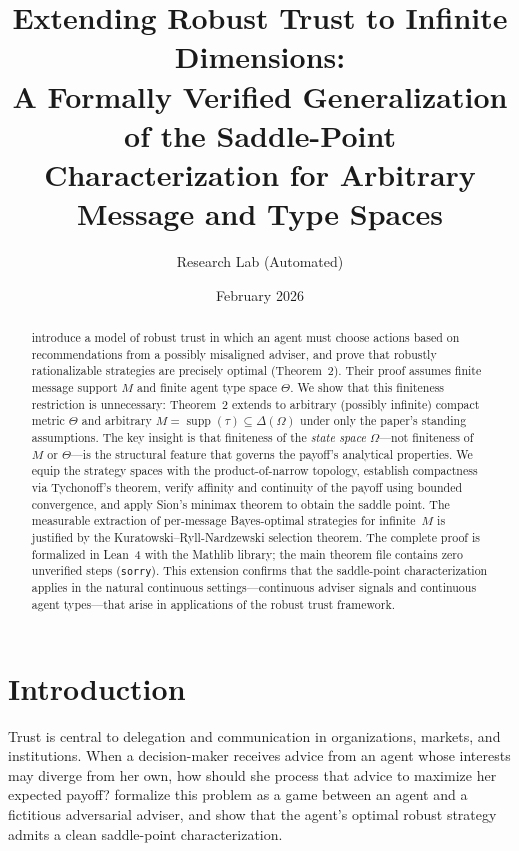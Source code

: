 \documentclass[11pt,a4paper]{article}
\title{%
  \textbf{Extending Robust Trust to Infinite Dimensions:}\\[4pt]
  \large A Formally Verified Generalization of the Saddle-Point\\
  Characterization for Arbitrary Message and Type Spaces%
}
\author{%
  Research Lab (Automated)%
}
\date{February 2026}
\theoremstyle{definition}
\DeclareMathOperator{\supp}{supp}
\newcommand{\sorry}{\texttt{sorry}}
\begin{document}
\maketitle

\begin{abstract}
\noindent
\citet{dworczak2026robust} introduce a model of robust trust in which an agent must choose actions based on recommendations from a possibly misaligned adviser, and prove that robustly rationalizable strategies are precisely optimal (Theorem~2).
Their proof assumes finite message support $M$ and finite agent type space $\Theta$.
We show that this finiteness restriction is unnecessary:
Theorem~2 extends to arbitrary (possibly infinite) compact metric $\Theta$ and arbitrary $M = \supp(\tau) \subseteq \Delta(\Omega)$ under only the paper's standing assumptions.
The key insight is that finiteness of the \emph{state space} $\Omega$---not finiteness of $M$ or $\Theta$---is the structural feature that governs the payoff's analytical properties.
We equip the strategy spaces with the product-of-narrow topology, establish compactness via Tychonoff's theorem, verify affinity and continuity of the payoff using bounded convergence, and apply Sion's minimax theorem to obtain the saddle point.
The measurable extraction of per-message Bayes-optimal strategies for infinite~$M$ is justified by the Kuratowski--Ryll-Nardzewski selection theorem.
The complete proof is formalized in Lean~4 with the Mathlib library; the main theorem file contains zero unverified steps (\sorry).
This extension confirms that the saddle-point characterization applies in the natural continuous settings---continuous adviser signals and continuous agent types---that arise in applications of the robust trust framework.
\end{abstract}

\section{Introduction}
\label{sec:intro}

Trust is central to delegation and communication in organizations, markets, and institutions.
When a decision-maker receives advice from an agent whose interests may diverge from her own, how should she process that advice to maximize her expected payoff?
\citet{dworczak2026robust} formalize this problem as a game between an agent and a fictitious adversarial adviser, and show that the agent's optimal robust strategy admits a clean saddle-point characterization.
\end{document}
